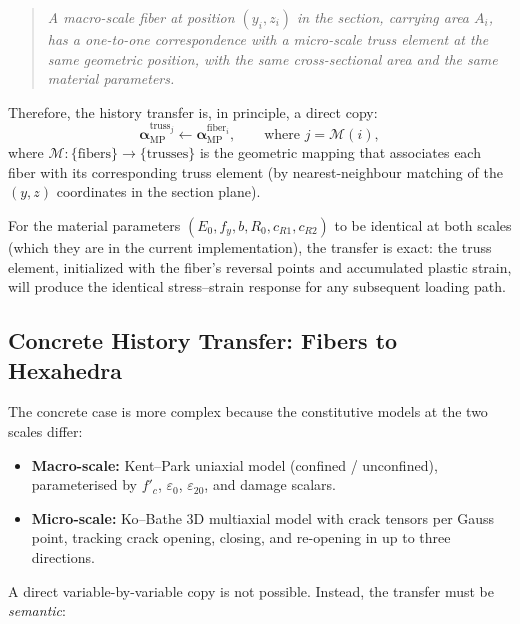 \begin{quote}
\itshape
A macro-scale fiber at position $(y_i, z_i)$ in the section, carrying
area $A_i$, has a one-to-one correspondence with a micro-scale truss
element at the same geometric position, with the same cross-sectional
area and the same material parameters.
\end{quote}

Therefore, the history transfer is, in principle, a direct copy:
\begin{equation}
  \boldsymbol{\alpha}_{\text{MP}}^{\text{truss}_j}
    \leftarrow
  \boldsymbol{\alpha}_{\text{MP}}^{\text{fiber}_i},
  \qquad
  \text{where } j = \mathcal{M}(i),
  \label{eq:mp-transfer}
\end{equation}
where $\mathcal{M}: \{\text{fibers}\} \to \{\text{trusses}\}$ is the
geometric mapping that associates each fiber with its corresponding
truss element (by nearest-neighbour matching of the $(y,z)$ coordinates
in the section plane).

For the material parameters $(E_0, f_y, b, R_0, c_{R1}, c_{R2})$
to be identical at both scales (which they are in the current
implementation), the transfer is exact: the truss element, initialized
with the fiber's reversal points and accumulated plastic strain, will
produce the identical stress--strain response for any subsequent
loading path.

\subsection{Concrete History Transfer: Fibers to Hexahedra}
\label{ssec:concrete-transfer}

The concrete case is more complex because the constitutive models at
the two scales differ:

\begin{itemize}
  \item \textbf{Macro-scale:}  Kent--Park uniaxial model (confined /
    unconfined), parameterised by $f'_c$, $\varepsilon_0$,
    $\varepsilon_{20}$, and damage scalars.
  \item \textbf{Micro-scale:}  Ko--Bathe 3D multiaxial model with crack
    tensors per Gauss point, tracking crack opening, closing, and
    re-opening in up to three directions.
\end{itemize}

A direct variable-by-variable copy is not possible.  Instead, the
transfer must be \emph{semantic}:


